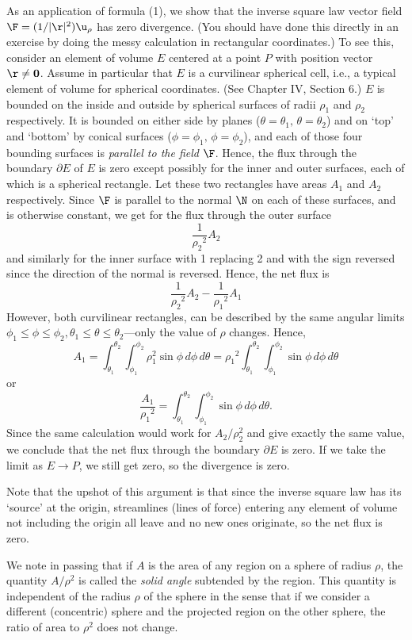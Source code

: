 As an application of formula (1), we show that the inverse
square law vector field $\F = (1/|\r|^2)\u_\rho$ has zero
divergence.  (You should have done this directly in an
exercise by doing
the messy calculation in rectangular coordinates.)
To see this, consider an element of volume $E$ centered at a point
$P$ with position vector $\r \not= \bold 0$.  Assume 
in particular that $E$ is a curvilinear spherical cell, i.e.,
a typical element of volume for spherical coordinates. 
(See Chapter IV, Section 6.) 
$E$ is bounded
on the inside and outside by spherical surfaces of radii $\rho_1$
and $\rho_2$ respectively.
It is bounded on either side by planes  ($\theta = \theta_1,\, \theta =
\theta_2$)  and on `top' and `bottom' by conical surfaces ($\phi = \phi_1,\,
\phi = \phi_2$), and each of those four bounding surfaces is
{\it parallel to the field\/}  $\F$.   Hence, 
the flux through the boundary $\partial E$ of $E$ is zero except
possibly for the inner and outer surfaces, each of which is
a spherical rectangle.  Let these two rectangles have areas
$A_1$ and $A_2$ respectively.  Since $\F$ is parallel to the 
normal $\N$ on each of these surfaces, and is otherwise constant,
we get for the flux through the outer surface
$$
    \frac 1{\rho_2{}^2} A_2
$$
and similarly for the inner surface  with 1 replacing 2
and with the sign reversed since
the direction of the normal is reversed.  Hence, the
net flux is
$$
   \frac 1{\rho_2{}^2} A_2
-\frac 1{\rho_1{}^2} A_1
$$
However, both curvilinear rectangles, can be described by
the same angular limits $\phi_1 \le \phi \le \phi_2,
\theta_1 \le \theta \le \theta_2$---only the value of $\rho$
changes.   Hence,
$$
A_1 = \int_{\theta_1}^{\theta_2}\int_{\phi_1}^{\phi_2}
\rho_1^2\sin\phi \,d\phi\,d\theta
=
\rho_1{}^2 \int_{\theta_1}^{\theta_2}\int_{\phi_1}^{\phi_2}
\sin\phi \,d\phi\,d\theta
$$
or
$$
 \frac{A_1}{\rho_1{}^2} =\int_{\theta_1}^{\theta_2}\int_{\phi_1}^{\phi_2}
\sin\phi \,d\phi\,d\theta.
$$
Since the same calculation would work for $A_2/\rho_2^2$ and give
exactly the same value, we conclude that the net flux through
the boundary $\partial E$ is zero.  If we take the limit as 
$E \to P$, we still get zero, so the divergence is zero.

Note that the upshot of this argument is that since the inverse
square law has its `source' at the origin, streamlines (lines
of force) entering any element of volume not including the
origin all leave and no new ones originate, so the net flux is
zero.

We note in passing that if $A$ is the area of any region on a
sphere of radius $\rho$, the quantity $A/\rho^2$ is called the
{\it solid angle\/} subtended by the region.  This quantity is
independent of the radius $\rho$ of the sphere in the sense
that if we consider a different (concentric) sphere and the
projected region on the other sphere, the ratio of area to
$\rho^2$ does not change.
%

